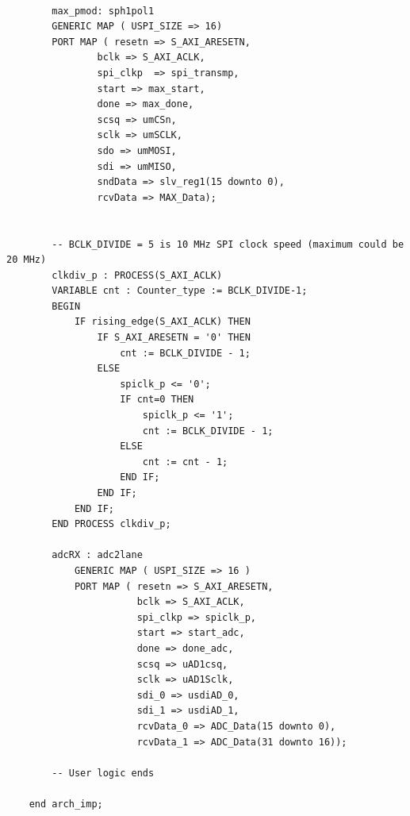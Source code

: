 \begin{verbatim}
    
        max_pmod: sph1pol1
        GENERIC MAP ( USPI_SIZE => 16)
        PORT MAP ( resetn => S_AXI_ARESETN,
                bclk => S_AXI_ACLK,
                spi_clkp  => spi_transmp,
                start => max_start,
                done => max_done,
                scsq => umCSn,
                sclk => umSCLK,
                sdo => umMOSI,
                sdi => umMISO,
                sndData => slv_reg1(15 downto 0),
                rcvData => MAX_Data);
    
    
        -- BCLK_DIVIDE = 5 is 10 MHz SPI clock speed (maximum could be 20 MHz)
        clkdiv_p : PROCESS(S_AXI_ACLK)
        VARIABLE cnt : Counter_type := BCLK_DIVIDE-1;
        BEGIN
            IF rising_edge(S_AXI_ACLK) THEN
                IF S_AXI_ARESETN = '0' THEN
                    cnt := BCLK_DIVIDE - 1;
                ELSE
                    spiclk_p <= '0';
                    IF cnt=0 THEN
                        spiclk_p <= '1';
                        cnt := BCLK_DIVIDE - 1;
                    ELSE
                        cnt := cnt - 1;
                    END IF;
                END IF;
            END IF; 
        END PROCESS clkdiv_p;
    
        adcRX : adc2lane
            GENERIC MAP ( USPI_SIZE => 16 )
            PORT MAP ( resetn => S_AXI_ARESETN,
                       bclk => S_AXI_ACLK,
                       spi_clkp => spiclk_p,
                       start => start_adc,
                       done => done_adc,
                       scsq => uAD1csq,
                       sclk => uAD1Sclk,
                       sdi_0 => usdiAD_0,
                       sdi_1 => usdiAD_1,
                       rcvData_0 => ADC_Data(15 downto 0),
                       rcvData_1 => ADC_Data(31 downto 16));
    
        -- User logic ends
    
    end arch_imp;
    \end{verbatim}